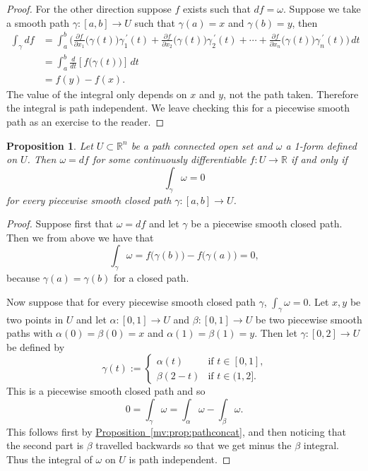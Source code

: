 \documentclass[12pt]{book}
\newcommand{\R}{{\mathbb{R}}}
\theoremstyle{plain}
\newtheorem{prop}[thm]{Proposition}
\theoremstyle{remark}
\theoremstyle{definition}
\theoremstyle{exercise}
\theoremstyle{example}
\newcommand{\propref}[1]{\hyperref[#1]{Proposition~\ref*{#1}}}
\begin{document}
\begin{proof}
For the other direction
suppose $f$ exists such that $df = \omega$.  Suppose we take a smooth
path
$\gamma \colon [a,b] \to U$ such that $\gamma(a) = x$ and
$\gamma(b) = y$, then
\begin{equation*}
\begin{split}
\int_\gamma df
& =
\int_a^b
\biggl(
\frac{\partial f}{\partial x_1}\bigl(\gamma(t)\bigr) \gamma_1^{\:\prime}(t)+
\frac{\partial f}{\partial x_2}\bigl(\gamma(t)\bigr) \gamma_2^{\:\prime}(t)+ \cdots +
\frac{\partial f}{\partial x_n}\bigl(\gamma(t)\bigr) \gamma_n^{\:\prime}(t)
\biggr) \, dt
\\
& = 
\int_a^b
\frac{d}{dt} \left[ f\bigl(\gamma(t)\bigr) \right]\, dt
\\
& = f(y)-f(x) .
\end{split}
\end{equation*}
The value of the integral only depends on $x$ and $y$, not the
path taken.  Therefore the integral is path independent.
We leave checking this for a piecewise smooth path as an exercise to the reader.
\end{proof}

\begin{prop}
Let $U \subset \R^n$ be a path connected open set and $\omega$
a 1-form defined on $U$.
Then $\omega = df$ for some continuously differentiable $f \colon U \to
\R$ if and only if
\begin{equation*}
\int_{\gamma} \omega = 0
\end{equation*}
for every piecewise smooth closed path $\gamma \colon [a,b] \to U$.
\end{prop}

\begin{proof}
Suppose first that $\omega = df$ and let $\gamma$ be a piecewise smooth
closed path.  Then we
from above we have that
\begin{equation*}
\int_{\gamma} \omega = f\bigl(\gamma(b)\bigr) - f\bigl(\gamma(a)\bigr) = 0 ,
\end{equation*}
because $\gamma(a) = \gamma(b)$ for a closed path.

Now suppose that for every piecewise smooth closed path $\gamma$, $\int_{\gamma} \omega = 0$.
Let $x,y$ be two points in $U$ and let $\alpha \colon [0,1] \to U$ and
$\beta \colon [0,1] \to U$ be two piecewise smooth paths with $\alpha(0) = \beta(0) = x$
and $\alpha(1) = \beta(1) = y$.  Then let $\gamma \colon [0,2] \to U$
be defined by
\begin{equation*}
\gamma(t) :=
\begin{cases}
\alpha(t) & \text{if $t \in [0,1]$,} \\
\beta(2-t) & \text{if $t \in (1,2]$.}
\end{cases}
\end{equation*}
This is a piecewise smooth closed path and so 
\begin{equation*}
0 = \int_{\gamma} \omega = \int_{\alpha} \omega - \int_{\beta} \omega .
\end{equation*}
This follows first by \propref{mv:prop:pathconcat}, and then noticing that
the second part is $\beta$ travelled backwards so that we get minus the
$\beta$ integral.  Thus the integral of $\omega$ on $U$ is path independent.
\end{proof}
\end{document}
